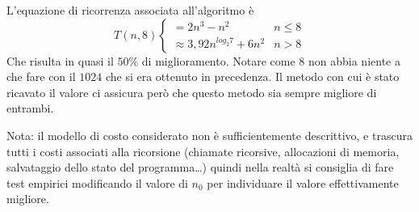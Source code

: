 L'equazione di ricorrenza associata all'algoritmo è
\begin{equation}
    T(n, 8) 
    \begin{cases}
        = 2n^3 - n^2 & n \leq 8 \\
        \approx 3,92 n^{log_2 7} + 6n^2 & n > 8
    \end{cases}
    \label{eq:richybrid8}
\end{equation}
Che risulta in quasi il $50\%$ di miglioramento. Notare come $8$ non abbia niente a che fare con il $1024$ che si era ottenuto in precedenza. Il metodo con cui è stato ricavato il valore ci assicura però che questo metodo sia sempre migliore di entrambi.

Nota: il modello di costo considerato non è sufficientemente descrittivo, e trascura tutti i costi associati alla ricorsione (chiamate ricorsive, allocazioni di memoria, salvataggio dello stato del programma\ldots) quindi nella realtà si consiglia di fare test empirici modificando il valore di $n_0$ per individuare il valore effettivamente migliore.
